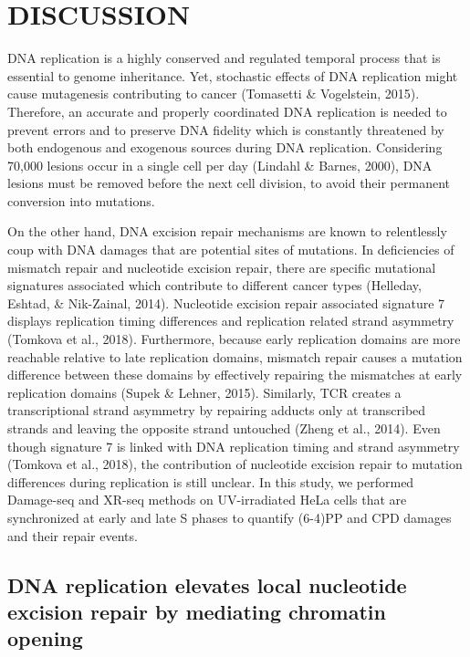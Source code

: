\setlength{\parindent}{0pt}
\chapter{\bf DISCUSSION}

DNA replication is a highly conserved and regulated temporal process that is essential to genome inheritance. Yet, stochastic effects of DNA replication might cause mutagenesis contributing to cancer (Tomasetti \& Vogelstein, 2015). Therefore, an accurate and properly coordinated DNA replication is needed to prevent errors and to preserve DNA fidelity which is constantly threatened by both endogenous and exogenous sources during DNA replication. Considering 70,000 lesions occur in a single cell per day (Lindahl \& Barnes, 2000), DNA lesions must be removed before the next cell division, to avoid their permanent conversion into mutations. 

On the other hand, DNA excision repair mechanisms are known to relentlessly coup with DNA damages that are potential sites of mutations. In deficiencies of mismatch repair and nucleotide excision repair, there are specific mutational signatures associated which contribute to different cancer types (Helleday, Eshtad, \& Nik-Zainal, 2014). Nucleotide excision repair associated signature 7 displays replication timing differences and replication related strand asymmetry (Tomkova et al., 2018). Furthermore, because early replication domains are more reachable relative to late replication domains, mismatch repair causes a mutation difference between these domains by effectively repairing the mismatches at early replication domains (Supek \& Lehner, 2015). Similarly, TCR creates a transcriptional strand asymmetry by repairing adducts only at transcribed strands and leaving the opposite strand untouched (Zheng et al., 2014). Even though signature 7 is linked with DNA replication timing and strand asymmetry (Tomkova et al., 2018), the contribution of nucleotide excision repair to mutation differences during replication is still unclear. In this study, we performed Damage-seq and XR-seq methods on UV-irradiated HeLa cells that are synchronized at early and late S phases to quantify (6-4)PP and CPD damages and their repair events. 

\section{DNA replication elevates local nucleotide excision repair by mediating chromatin opening}

